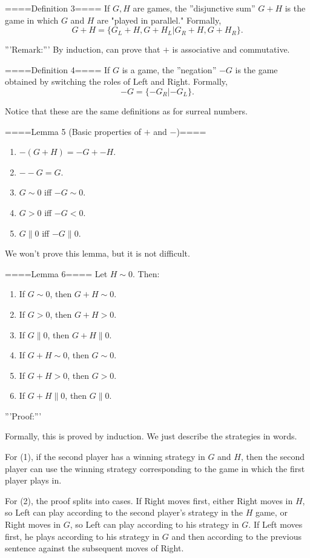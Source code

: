 ====Definition 3====
If $G,H$ are games, the ''disjunctive sum'' $G+H$ is the game in which $G$ and $H$ are "played in parallel." Formally,
$$G+H=\{G_L+H,G+H_L|G_R+H, G+H_R\}.$$

'''Remark:'''
By induction, can prove that $+$ is associative and commutative. 

====Definition 4====
If $G$ is a game, the ''negation'' $-G$ is the game obtained by switching the roles of Left and Right. Formally,
$$-G=\{-G_R|-G_L\}.$$

Notice that these are the same definitions as for surreal numbers.

====Lemma 5 (Basic properties of $+$ and $-$)====
\begin{enumerate}
  \item  $-(G+H)=-G+-H$.
  \item  $--G=G$.
  \item  $G\sim 0$ iff $-G\sim 0$.
  \item  $G>0$ iff $-G<0$.
  \item  $G\parallel 0$ iff $-G\parallel 0$.
\end{enumerate}
We won't prove this lemma, but it is not difficult.

====Lemma 6====
Let $H\sim 0$. Then:
\begin{enumerate}
  \item  If $G\sim 0$, then $G+H\sim 0$.
  \item  If $G>0$, then $G+H>0$.
  \item  If $G\parallel 0$, then $G+H\parallel 0$.
  \item  If $G+H\sim 0$, then $G\sim 0$.
  \item  If $G+H>0$, then $G>0$.
  \item  If $G+H\parallel 0$, then $G\parallel 0$.
\end{enumerate}
'''Proof:'''

Formally, this is proved by induction. We just describe the strategies in words.

For (1), if the second player has a winning strategy in $G$ and $H$, then the second player can use the winning strategy corresponding to the game in which the first player plays in.

For (2), the proof splits into cases. If Right moves first, either Right moves in $H$, so Left can play according to the second player's strategy in the $H$ game, or Right moves in $G$, so Left can play according to his strategy in $G$. If Left moves first, he plays according to his strategy in $G$ and then according to the previous sentence against the subsequent moves of Right.

